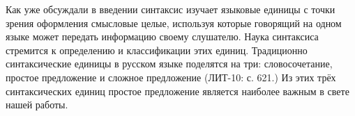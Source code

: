 Как уже обсуждали в введении синтаксис изучает языковые единицы с точки зрения оформления смысловые целые, используя которые говорящий на одном языке может передать информацию своему слушателю. Наука синтаксиса стремится к определению и классификации этих единиц. Традиционно синтаксические единицы в русском языке поделятся на три: словосочетание, простое предложение и сложное предложение (ЛИТ-10: с. 621.) Из этих трёх синтаксических единиц простое предложение является наиболее важным в свете нашей работы.


%
%
%
%
%
%
%
%
%
%
%
%
%
%
%
